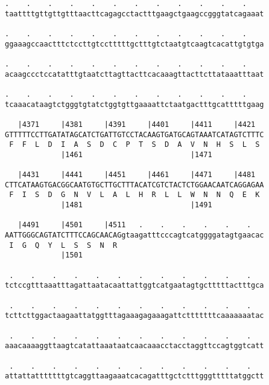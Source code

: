 \documentclass{article}
\begin{document}
\begin{Verbatim}
.    .    .    .    .    .    .    .    .    .    .    .    
taattttgttgttgtttaacttcagagcctactttgaagctgaagccgggtatcagaaat
                                                            
.    .    .    .    .    .    .    .    .    .    .    .    
ggaaagccaactttctccttgtcctttttgctttgtctaatgtcaagtcacattgtgtga
                                                            
.    .    .    .    .    .    .    .    .    .    .    .    
acaagccctccatatttgtaatcttagttacttcacaaagttacttcttataaatttaat
                                                            
.    .    .    .    .    .    .    .    .    .    .    .    
tcaaacataagtctgggtgtatctggtgttgaaaattctaatgactttgcatttttgaag
                                                            
   |4371     |4381     |4391     |4401     |4411     |4421  
GTTTTTCCTTGATATAGCATCTGATTGTCCTACAAGTGATGCAGTAAATCATAGTCTTTC
 F  F  L  D  I  A  S  D  C  P  T  S  D  A  V  N  H  S  L  S 
             |1461                         |1471            
  
   |4431     |4441     |4451     |4461     |4471     |4481  
CTTCATAAGTGACGGCAATGTGCTTGCTTTACATCGTCTACTCTGGAACAATCAGGAGAA
 F  I  S  D  G  N  V  L  A  L  H  R  L  L  W  N  N  Q  E  K 
             |1481                         |1491            
  
   |4491     |4501     |4511   .    .    .    .    .    .   
AATTGGGCAGTATCTTTCCAGCAACAGgtaagatttcccagtcatggggatagtgaacac
 I  G  Q  Y  L  S  S  N  R                                  
             |1501                                          
  
 .    .    .    .    .    .    .    .    .    .    .    .   
tctccgtttaaatttagattaatacaattattggtcatgaatagtgctttttactttgca
                                                            
 .    .    .    .    .    .    .    .    .    .    .    .   
tcttcttggactaagaattatggtttagaaagagaaagattctttttttcaaaaaaatac
                                                            
 .    .    .    .    .    .    .    .    .    .    .    .   
aaacaaaaggttaagtcatattaaataatcaacaaacctacctaggttccagtggtcatt
                                                            
 .    .    .    .    .    .    .    .    .    .    .    .   
attattatttttttgtcaggttaagaaatcacagatttgctctttgggtttttatggctt
                                                            

\end{Verbatim}
\end{document}
